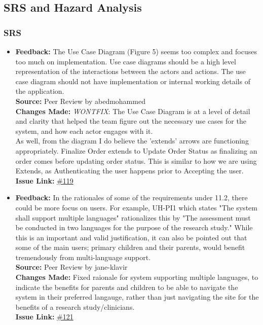 \documentclass{article}
\begin{document}

\subsection{SRS and Hazard Analysis}

\subsubsection{SRS}
\begin{itemize}

  \item 
    \textbf{Feedback:} The Use Case Diagram (Figure 5) seems too complex and focuses too much on implementation. Use case diagrams should be a high level representation of the interactions between the actors and actions. The use case diagram should not have implementation or internal working details of the application. \\
    \textbf{Source:} Peer Review by abedmohammed\\
    \textbf{Changes Made:} \textit{WONTFIX}: The Use Case Diagram is at a level of detail and clarity that helped the team figure out the necessary use cases for the system, and how each actor engages with it.\\
    As well, from the diagram I do believe the 'extends' arrows are functioning appropriately. Finalize Order extends to Update Order Status as finalizing an order comes before updating order status. This is similar to how we are using Extends, as Authenticating the user happens prior to Accepting the user.\\
    \textbf{Issue Link:} \href{https://github.com/parishanizam/TeleHealth/issues/119}{\#119}
  
  \item 
    \textbf{Feedback:} In the rationales of some of the requirements under 11.2, there could be more focus on users. For example, UH-PI1 which states "The system shall support multiple languages" rationalizes this by "The assessment must be conducted in two languages for the purpose of the research study." While this is an important and valid justification, it can also be pointed out that some of the main users; primary children and their parents, would benefit tremendously from multi-language support. \\
    \textbf{Source:} Peer Review by jane-klavir\\
    \textbf{Changes Made:} Fixed raionale for system supporting multiple languages, to indicate the benefits for parents and children to be able to navigate the system in their preferred langauge, rather than just navigating the site for the benefits of a research study/clinicians.\\
    \textbf{Issue Link:} \href{https://github.com/parishanizam/TeleHealth/issues/121}{\#121}
  

\end{itemize}
\end{document}

